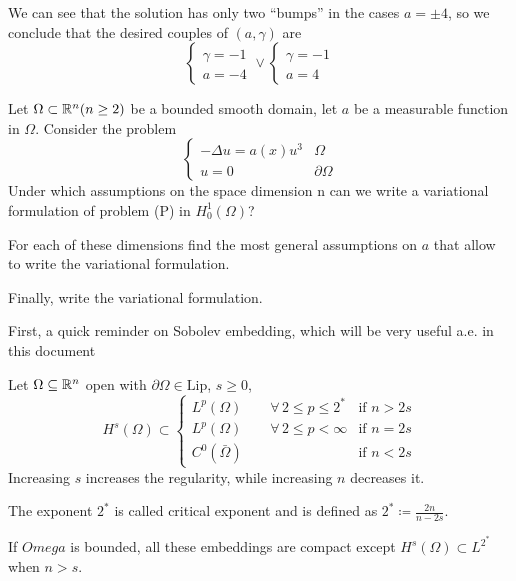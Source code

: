 We can see that the solution has only two ``bumps'' in the cases \(a = \pm 4\), so we conclude that the desired couples of \((a, \gamma)\) are 
\[
    \begin{cases}
        \gamma = -1\\
        a = -4
    \end{cases}
    \vee
    \begin{cases}
        \gamma = -1 \\ 
        a = 4
    \end{cases}
\]
\newpage
\begin{exercise}
Let \(\Omega \subset \mathbb{R}^n (n \geq 2)\) be a bounded smooth domain, let \(a\) be a measurable function in \(\Omega\).
Consider the problem
\[
    \begin{cases}
        - \Delta u = a(x) u^3 & \Omega \\
        u = 0 & \partial\Omega
    \end{cases}
    \tag*{(P)}
\]
Under which assumptions on the space dimension n can we write a variational formulation of problem (P) in
\(H^1_0(\Omega)\)? 

For each of these dimensions find the most general assumptions on \(a\) that allow to write the variational formulation. 

Finally, write the variational formulation.
\end{exercise}

First, a quick reminder on Sobolev embedding, which will be very useful a.e. in this document
\begin{remark}\label{sobolev_embedding}
    Let \(\Omega \subseteq \mathbb{R}^n\) open with \(\partial\Omega \in \text{Lip}\), \(s \geq 0\),
    \[
        H^s(\Omega) \subset 
        \begin{cases}
            L^p(\Omega) \qquad \forall \, 2 \leq p \leq 2^* & \text{if } n > 2s \\
            L^p(\Omega) \qquad \forall \, 2 \leq p < \infty & \text{if } n = 2s \\
            C^0(\bar{\Omega})  & \text{if } n < 2s
        \end{cases}
    \]
    Increasing \(s\) increases the regularity, while increasing \(n\) decreases it.

    The exponent \(2^*\) is called critical exponent and is defined as \(2^* \coloneqq \frac{2n}{n - 2s}\).

    If \(Omega\) is bounded, all these embeddings are compact except \(H^s(\Omega) \subset L^{2^*}\) when \(n > s\).
\end{remark}


